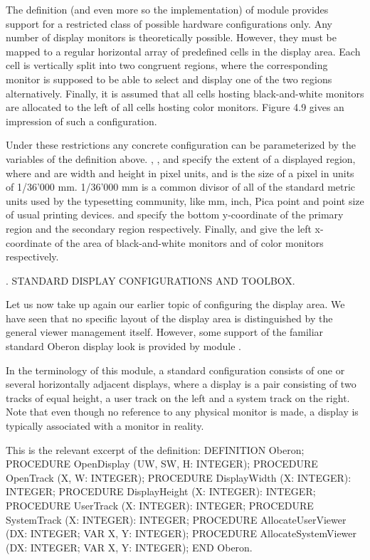 \noindent The definition (and even more so the implementation) of module 
provides support for a restricted class of possible hardware
configurations only. Any number of display monitors is theoretically
possible. However, they must be mapped to a regular horizontal array
of predefined cells in the display area. Each cell is vertically split
into two congruent regions, where the corresponding monitor is
supposed to be able to select and display one of the two regions
alternatively. Finally, it is assumed that all cells hosting
black-and-white monitors are allocated to the left of all cells
hosting color monitors. Figure 4.9 gives an impression of such a
configuration.


Under these restrictions any concrete configuration can be
parameterized by the variables of the definition above. , ,
and  specify the extent of a displayed region, where  and
 are width and height in pixel units, and  is the size of a
pixel in units of 1/36’000 mm. 1/36’000 mm is a common divisor of all
of the standard metric units used by the typesetting community, like
mm, inch, Pica point and point size of usual printing devices. 
and  specify the bottom y-coordinate of the primary region and
the secondary region respectively. Finally,  and  give the
left x-coordinate of the area of black-and-white monitors and of color
monitors respectively.

. STANDARD DISPLAY CONFIGURATIONS AND TOOLBOX.

Let us now take up again our earlier topic of configuring the display
area. We have seen that no specific layout of the display area is
distinguished by the general viewer management itself. However, some
support of the familiar standard Oberon display look is provided by
module .

In the terminology of this module, a standard configuration consists
of one or several horizontally adjacent displays, where a display is a
pair consisting of two tracks of equal height, a user track on the
left and a system track on the right. Note that even though no
reference to any physical monitor is made, a display is typically
associated with a monitor in reality.

This is the relevant excerpt of the definition:
\begintt
DEFINITION Oberon;
  PROCEDURE OpenDisplay (UW, SW, H: INTEGER);
  PROCEDURE OpenTrack (X, W: INTEGER);
  PROCEDURE DisplayWidth (X: INTEGER): INTEGER;
  PROCEDURE DisplayHeight (X: INTEGER): INTEGER;
  PROCEDURE UserTrack (X: INTEGER): INTEGER;
  PROCEDURE SystemTrack (X: INTEGER): INTEGER;
  PROCEDURE AllocateUserViewer (DX: INTEGER; VAR X, Y: INTEGER);
  PROCEDURE AllocateSystemViewer (DX: INTEGER; VAR X, Y: INTEGER);
END Oberon.
\endtt

